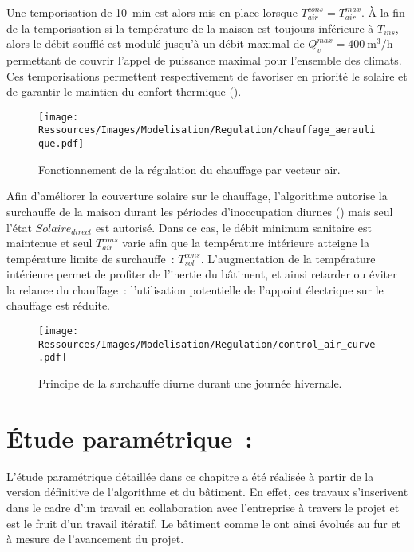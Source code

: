 Une temporisation de \SI{10}{min} est alors mis en place lorsque $T_{air}^{cons} = T_{air}^{max}$.
À la fin de la temporisation si la température de la maison est
toujours inférieure à $T_{ins}$, alors le débit soufflé est modulé jusqu’à un débit maximal de
$Q_{v}^{max} = \SI[per-mode=symbol]{400}{\meter\cubed\per\hour}$ permettant de couvrir
l’appel de puissance maximal pour l’ensemble des climats. Ces
temporisations permettent respectivement de favoriser en priorité le solaire et de
garantir le maintien du confort thermique ().

\begin{figure}
    \centering
    \texttt{[image: Ressources/Images/Modelisation/Regulation/chauffage\_aeraulique.pdf]}
    \caption{Fonctionnement de la régulation du chauffage par vecteur air.}
    \label{fig:chauffage_aeraulique}
\end{figure}

Afin d’améliorer la couverture solaire sur le chauffage, l’algorithme autorise la
surchauffe de la maison durant les périodes d’inoccupation diurnes
() mais seul l’état $Solaire_{direct}$ est autorisé. Dans ce
cas, le débit minimum sanitaire est maintenue et seul $T_{air}^{cons}$ varie afin que la
température intérieure atteigne la température limite de surchauffe~: $T^{cons}_{sol}$.
L’augmentation de la température intérieure permet de profiter de l’inertie du bâtiment, et
ainsi retarder ou éviter la relance du chauffage~: l’utilisation potentielle de
l’appoint électrique sur le chauffage est réduite.
\begin{figure}
    \centering
    \texttt{[image: Ressources/Images/Modelisation/Regulation/control\_air\_curve.pdf]}
    \caption{Principe de la surchauffe diurne durant une journée hivernale.}
    \label{fig:control_air}
\end{figure}








\section{Étude paramétrique~:} %
\label{sec:etude_parametrique}
L’étude paramétrique détaillée dans ce chapitre a été réalisée à partir de la
version définitive de l’algorithme et du bâtiment. En effet, ces travaux s’inscrivent
dans le cadre d’un travail en collaboration avec l’entreprise  à travers le projet
 et est le fruit d’un travail itératif. Le bâtiment comme le  ont
ainsi évolués au fur et à mesure de l’avancement du projet.

